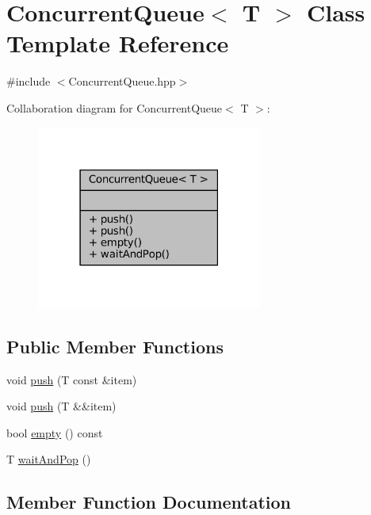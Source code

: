 \hypertarget{classConcurrentQueue}{}\section{Concurrent\+Queue$<$ T $>$ Class Template Reference}
\label{classConcurrentQueue}


{\ttfamily \#include $<$Concurrent\+Queue.\+hpp$>$}



Collaboration diagram for Concurrent\+Queue$<$ T $>$\+:
\nopagebreak
\begin{figure}[H]
\begin{center}
\leavevmode
\includegraphics[width=210pt]{classConcurrentQueue__coll__graph}
\end{center}
\end{figure}
\subsection*{Public Member Functions}
\begin{DoxyCompactItemize}
\item 
void \mbox{\hyperlink{classConcurrentQueue_a6ce0d6512df1718fb8c5440a6ab4712b}{push}} (T const \&item)
\item 
void \mbox{\hyperlink{classConcurrentQueue_a3f75ad8a52994e2654ccc45031446ef5}{push}} (T \&\&item)
\item 
bool \mbox{\hyperlink{classConcurrentQueue_afe1975556ef77182f03fdf26a25bb7ef}{empty}} () const
\item 
T \mbox{\hyperlink{classConcurrentQueue_a1ea1e6082792691143b62317a9ac99ac}{wait\+And\+Pop}} ()
\end{DoxyCompactItemize}


\subsection{Member Function Documentation}
\mbox{\label{classConcurrentQueue_afe1975556ef77182f03fdf26a25bb7ef}} 
